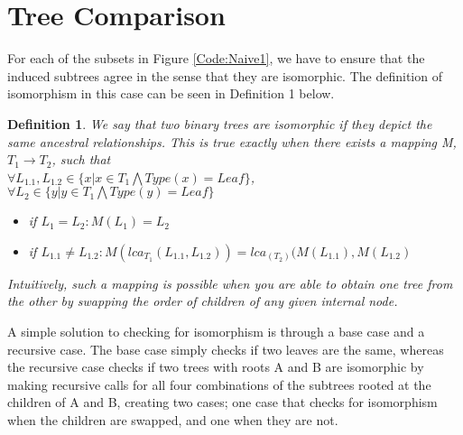 \section{Tree Comparison}
For each of the subsets in Figure \ref{Code:Naive1}, we have to ensure that the induced subtrees agree in the sense that they are isomorphic. The definition of isomorphism in this case can be seen in Definition 1 below.

\newtheorem{definition}{Definition}
\begin{definition}
	We say that two binary trees are isomorphic if they depict the same ancestral relationships. This is true exactly when there exists a mapping M, $T_1 \rightarrow T_2$, such that \\
	$\forall L_{1.1}, L_{1.2} \in \{ x | x \in T_1 \bigwedge Type(x)=Leaf \}$, \\ $\forall L_2 \in \{ y | y \in T_1 \bigwedge Type(y)=Leaf \}$
	\begin{itemize}
		\item if $L_1 = L_2 : M(L_1)=L_2$
		
		\item if $L_{1.1} \neq L_{1.2} : M(lca_{T_1}(L_{1.1}, L_{1.2})) = lca_(T_2)(M(L_{1.1}), M(L_{1.2})$
	\end{itemize}
	Intuitively, such a mapping is possible when you are able to obtain one tree from the other by swapping the order of children of any given internal node.  
\end{definition}

A simple solution to checking for isomorphism is through a base case and a recursive case. The base case simply checks if two leaves are the same, whereas the recursive case checks if two trees with roots A and B are isomorphic by making recursive calls for all four combinations of the subtrees rooted at the children of A and B, creating two cases; one case that checks for isomorphism when the children are swapped, and one when they are not. 





